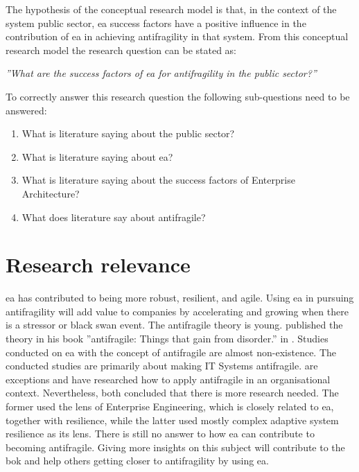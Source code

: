 The hypothesis of the conceptual research model is that, in the context of the system public sector, \acrlong{ea} success factors have a positive influence in the contribution of \acrlong{ea} in achieving antifragility in that system. From this conceptual research model the research question can be stated as:\bigskip

\noindent \emph{''What are the success factors of \acrlong{ea} for \gls{antifragility} in the public sector?''}\bigskip

\noindent To correctly answer this research question the following sub-questions need to be answered:

\begin{enumerate}
	\item{What is literature saying about the public sector?}
	\item{What is literature saying about \acrlong{ea}?}
	\item{What is literature saying about the success factors of Enterprise Architecture?}
	\item{What does literature say about antifragile?}
\end{enumerate}
\section{Research relevance}
\label{sec:researchrelevance}

\acrshort{ea} has contributed to being more \gls{robust}, \gls{resilient}, and \gls{agile}. Using \acrshort{ea} in pursuing \gls{antifragility} will add value to companies by accelerating and growing when there is a stressor or black swan event. The \gls{antifragile} theory is young.  \citeauthor{Taleb2012} published the theory in his book ''\Gls{antifragile}: Things that gain from disorder.'' in \citeyear{Taleb2012}.  Studies conducted on \acrshort{ea} with the concept of \gls{antifragile} are almost non-existence. The conducted studies are primarily about making IT Systems \gls{antifragile}. \textcite{Botjes2020,Kastner2017} are exceptions and have researched how to apply \gls{antifragile} in an organisational context. Nevertheless, both concluded that there is more research needed. The former used the lens of Enterprise Engineering, which is closely related to \acrshort{ea}, together with resilience, while the latter used mostly complex adaptive system resilience as its lens. There is still no answer to how \acrshort{ea} can contribute to becoming \gls{antifragile}. Giving more insights on this subject will contribute to the \acrshort{bok} and help others getting closer to \gls{antifragility} by using \acrshort{ea}.

